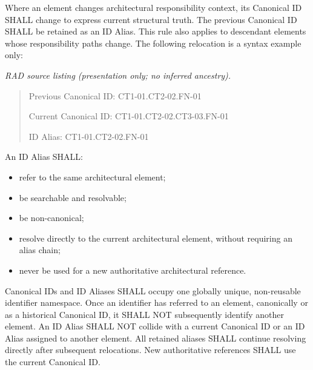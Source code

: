 Where an element changes architectural responsibility context, its Canonical ID SHALL change to express current structural truth. The previous Canonical ID SHALL be retained as an ID Alias. This rule also applies to descendant elements whose responsibility paths change. The following relocation is a syntax example only:

\label{rad:metamodel:401}

\textit{RAD source listing (presentation only; no inferred ancestry).}
\begin{quote}
Previous Canonical ID: CT1-01.CT2-02.FN-01

Current Canonical ID:  CT1-01.CT2-02.CT3-03.FN-01

ID Alias:              CT1-01.CT2-02.FN-01
\end{quote}
\label{rad:metamodel:407}

An ID Alias SHALL:

\label{rad:metamodel:409}

\begin{itemize}

\item 
refer to the same architectural element;



\item 
be searchable and resolvable;



\item 
be non-canonical;



\item 
resolve directly to the current architectural element, without requiring an alias chain;



\item 
never be used for a new authoritative architectural reference.



\end{itemize}
\label{rad:metamodel:415}

Canonical IDs and ID Aliases SHALL occupy one globally unique, non-reusable identifier namespace. Once an identifier has referred to an element, canonically or as a historical Canonical ID, it SHALL NOT subsequently identify another element. An ID Alias SHALL NOT collide with a current Canonical ID or an ID Alias assigned to another element. All retained aliases SHALL continue resolving directly after subsequent relocations. New authoritative references SHALL use the current Canonical ID.

